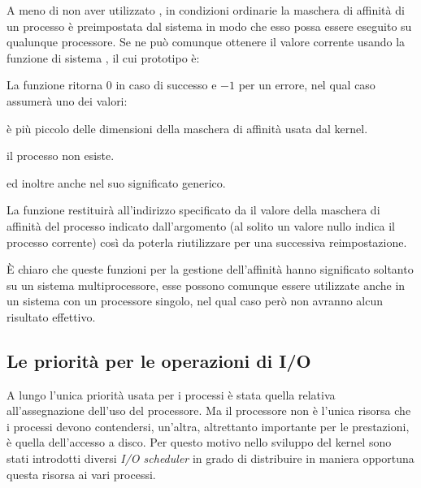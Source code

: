 
A meno di non aver utilizzato , in condizioni
ordinarie la maschera di affinità di un processo è preimpostata dal sistema in
modo che esso possa essere eseguito su qualunque processore. Se ne può
comunque ottenere il valore corrente usando la funzione di sistema
, il cui prototipo è:

\begin{funcproto}{ 
}
{La funzione ritorna $0$ in caso di successo e $-1$ per un errore, nel qual
caso  assumerà uno dei valori:
\begin{errlist}
\item[\errcode{EINVAL}]  è più piccolo delle dimensioni
  della maschera di affinità usata dal kernel.
\item[\errcode{ESRCH}] il processo  non esiste.
\end{errlist}
ed inoltre anche  nel suo significato generico.}
\end{funcproto}

La funzione restituirà all'indirizzo specificato da  il valore
della maschera di affinità del processo indicato dall'argomento 
(al solito un valore nullo indica il processo corrente) così da poterla
riutilizzare per una successiva reimpostazione.

È chiaro che queste funzioni per la gestione dell'affinità hanno significato
soltanto su un sistema multiprocessore, esse possono comunque essere
utilizzate anche in un sistema con un processore singolo, nel qual caso però
non avranno alcun risultato effettivo.



\subsection{Le priorità per le operazioni di I/O}
\label{sec:io_priority}

A lungo l'unica priorità usata per i processi è stata quella relativa
all'assegnazione dell'uso del processore. Ma il processore non è l'unica
risorsa che i processi devono contendersi, un'altra, altrettanto importante
per le prestazioni, è quella dell'accesso a disco. Per questo motivo nello
sviluppo del kernel sono stati introdotti diversi \textit{I/O scheduler} in
grado di distribuire in maniera opportuna questa risorsa ai vari processi.

